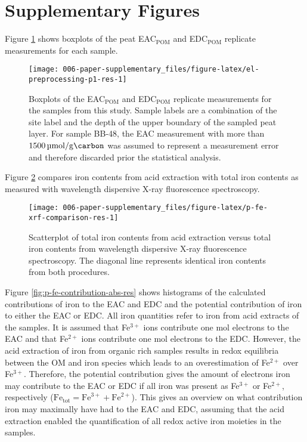 \documentclass[draft,linenumbers]{agujournal2018}
\begin{document}
\clearpage

\section{Supplementary Figures}

Figure \ref{fig:el-preprocessing-p1-res} shows boxplots of the peat
EAC\(_\text{POM}\) and EDC\(_\text{POM}\) replicate measurements for
each sample.

\begin{figure}[H]

{\centering \texttt{[image: 006-paper-supplementary\_files/figure-latex/el-preprocessing-p1-res-1]} 

}

\caption{Boxplots of the EAC$_\text{POM}$ and EDC$_\text{POM}$ replicate measurements for the samples from this study. Sample labels are a combination of the site label and the depth of the upper boundary of the sampled peat layer. For sample BB-48, the EAC measurement with more than $\SI{1500}{\micro\mol\per\gram\carbon}$ was assumed to represent a measurement error and therefore discarded prior the statistical analysis.}\label{fig:el-preprocessing-p1-res}
\end{figure}

\clearpage

Figure \ref{fig:p-fe-xrf-comparison-res} compares iron contents from
acid extraction with total iron contents as measured with wavelength
dispersive X-ray fluorescence spectroscopy.

\begin{figure}[H]

{\centering \texttt{[image: 006-paper-supplementary\_files/figure-latex/p-fe-xrf-comparison-res-1]} 

}

\caption{Scatterplot of total iron contents from acid extraction versus total iron contents from wavelength dispersive X-ray fluorescence spectroscopy. The diagonal line represents identical iron contents from both procedures.}\label{fig:p-fe-xrf-comparison-res}
\end{figure}

Figure \ref{fig:p-fe-contribution-abs-res} shows histograms of the
calculated contributions of iron to the EAC and EDC and the potential
contribution of iron to either the EAC or EDC. All iron quantities refer
to iron from acid extracts of the samples. It is assumed that
Fe\(^{3+}\) ions contribute one mol electrons to the EAC and that
Fe\(^{2+}\) ions contribute one mol electrons to the EDC. However, the
acid extraction of iron from organic rich samples results in redox
equilibria between the OM and iron species which leads to an
overestimation of Fe\(^{2+}\) over Fe\(^{3+}\). Therefore, the potential
contribution gives the amount of electrons iron may contribute to the
EAC or EDC if all iron was present as Fe\(^{3+}\) or Fe\(^{2+}\),
respectively (\(\text{Fe}_\text{tot}=\text{Fe}^{3+} + \text{Fe}^{2+}\)).
This gives an overview on what contribution iron may maximally have had
to the EAC and EDC, assuming that the acid extraction enabled the
quantification of all redox active iron moieties in the samples.
\end{document}
